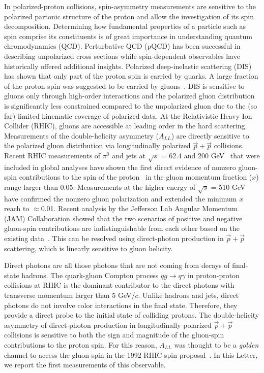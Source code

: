 \documentclass[twocolumn,letterpaper,aps,prl,longbibliography,superscriptaddress,floatfix]{revtex4-2}
\newcommand{\pizero}{\mbox{$\pi^0$}\xspace}
\newcommand{\ALL}{\mbox{$A_{LL}$}\xspace}
\begin{document}
In polarized-proton collisions, spin-asymmetry measurements are 
sensitive to the polarized partonic structure of the proton and allow 
the investigation of its spin decomposition. Determining how fundamental 
properties of a particle such as spin comprise its constituents 
is of great importance in understanding quantum chromodynamics (QCD). 
Perturbative QCD (pQCD) has been successful in describing unpolarized 
cross sections while spin-dependent observables have historically 
offered additional insights. Polarized deep-inelastic scattering (DIS) 
has shown that only part of the proton spin is carried by quarks.
A large fraction of the proton spin was suggested to be carried by 
gluons~\cite{1988364,ASHMAN19891,PhysRevD.58.112001,ALEXAKHIN20078, 
PhysRevD.75.012007}. DIS is sensitive to gluons only through high-order 
interactions and the polarized gluon distribution is significantly less 
constrained compared to the unpolarized gluon due to the (so far) limited 
kinematic coverage of polarized data. At the Relativistic Heavy 
Ion Collider (RHIC), gluons are accessible at leading order in the hard 
scattering.  Measurements of the double-helicity asymmetry (\ALL) are 
directly sensitive to the polarized gluon distribution via 
longitudinally polarized $\vec{p}+\vec{p}$ collisions. Recent RHIC 
measurements of \pizero and jets at $\sqrt{s}$ = 62.4 and 200 
GeV~\cite{PhysRevD.90.012007,PhysRevLett.103.012003,PhysRevD.79.012003, 
PhysRevD.86.032006,PhysRevLett.115.092002} that 
were included in global analyses have shown the first direct evidence of 
nonzero gluon-spin contributions to the spin of the 
proton~\cite{PhysRevLett.113.012001, 2014276} in the gluon momentum 
fraction ($x$) range larger than 0.05. Measurements at the higher energy 
of $\sqrt{s}$ = 510 GeV~\cite{PhysRevD.93.011501,PhysRevD.100.052005} 
have confirmed the nonzero gluon polarization and extended the minimum 
$x$ reach to $\approx$0.01. Recent analysis by the Jefferson Lab Angular 
Momentum (JAM) Collaboration showed that the two scenarios of positive 
and negative gluon-spin contributions are indistinguishable from each 
other based on the existing data~\cite{PhysRevD.105.074022}.
This can be resolved using direct-photon production in 
$\vec{p}+\vec{p}$ scattering, which is linearly sensitive to gluon 
helicity.

Direct photons are all those photons that are not coming from decays of 
final-state hadrons. The quark-gluon Compton process $qg \rightarrow 
q\gamma$ in proton-proton collisions at RHIC is the dominant contributor 
to the direct photons with transverse momentum larger than 5 GeV/$c$. 
Unlike hadrons and jets, direct photons do not involve color 
interactions in the final state. Therefore, they provide a direct probe 
to the initial state of colliding protons. The double-helicity asymmetry 
of direct-photon production in longitudinally polarized $\vec{p}+\vec{p}$ 
collisions is sensitive to both the sign and magnitude of the gluon-spin 
contributions to the proton spin. For this reason, \ALL was thought 
to be a \textit{golden} channel to access the gluon spin in the 1992 
RHIC-spin proposal~\cite{Bunce:1992vca,doi:10.1146/annurev.nucl.50.1.525}. 
In this Letter, we report the first measurements of this observable.
\end{document}
